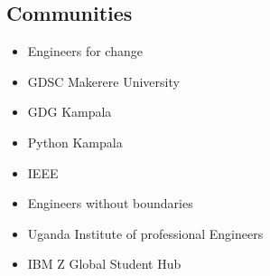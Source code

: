 \documentclass[a4paper]{article}
\begin{document}
\begin{minipage}[t]{0.5\textwidth}
        \subsection*{Communities}
        \begin{itemize}
            \item Engineers for change
            \item GDSC Makerere University
            \item GDG Kampala
            \item Python Kampala
            \item IEEE
            \item Engineers without boundaries
            \item Uganda Institute of professional Engineers
            \item IBM Z Global Student Hub
        \end{itemize}
    \end{minipage}
\end{document}
